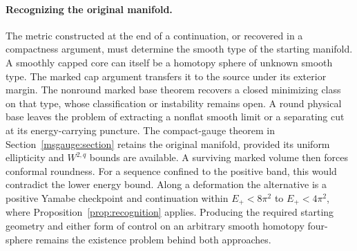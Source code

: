 \documentclass[11pt]{article}
\numberwithin{equation}{section}
\theoremstyle{definition}
\theoremstyle{remark}
\begin{document}
\paragraph{Recognizing the original manifold.}
The metric constructed at the end of a continuation, or recovered in
a compactness argument, must determine the smooth type of the starting
manifold. A smoothly capped core can itself be a homotopy sphere of unknown
smooth type. The marked cap argument transfers it to the source
under its exterior margin. The nonround marked base theorem
recovers a closed minimizing class on that type, whose
classification or instability remains open. A round physical base
leaves the problem of extracting a nonflat smooth limit or a
separating cut at its energy-carrying puncture. The compact-gauge theorem in
Section~\ref{msgauge:section} retains the original manifold, provided
its uniform ellipticity and \(W^{2,q}\) bounds are available. A surviving
marked volume then forces conformal roundness. For a sequence confined
to the positive band, this would contradict the lower energy bound.
Along a deformation the alternative is a positive Yamabe checkpoint
and continuation within
\(E_+<8\pi^2\) to \(E_+<4\pi^2\), where Proposition~\ref{prop:recognition}
applies. Producing the required starting geometry and either form of
control on an arbitrary smooth homotopy four-sphere remains the
existence problem behind both approaches.

\clearpage
\setlength{\bibitemsep}{.36\baselineskip}
\printbibliography[heading=bibintoc]
\end{document}
